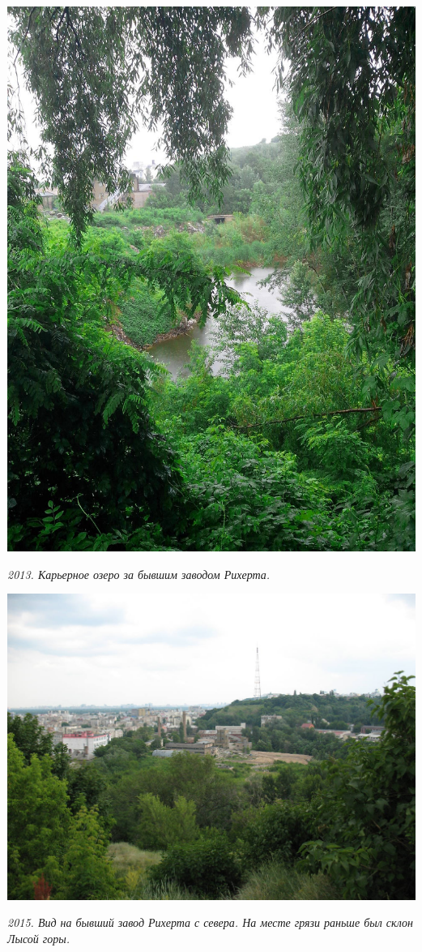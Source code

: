 \begin{center}
\includegraphics[width=\linewidth]{pix/s-rihert-IMG_20130602_161845.jpg}

\textit{2013. Карьерное озеро за бывшим заводом Рихерта.}
\end{center} 
\vspace*{\fill}
\newpage

\begin{center}
\includegraphics[width=0.98\linewidth]{pix/s-rihert-IMG_4358.JPG}

\textit{2015. Вид на бывший завод Рихерта с севера. На месте грязи раньше был склон Лысой горы.}
\end{center} 

